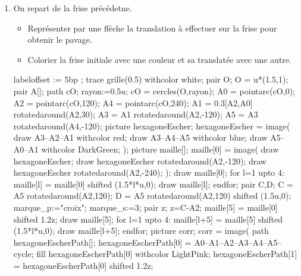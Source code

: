 \begin{corrige}
\begin{enumerate}
\begin{Geometrie}[CoinHD={(8u,3u)}]
        \end{Geometrie}
        \item On repart de la frise précédetne.
        \begin{itemize}
            \item Représenter par une flèche la translation à effectuer sur la frise pour obtenir le pavage.
            \item Colorier la frise initiale avec une couleur et sa translatée avec une autre.
        \end{itemize}
        \hspace*{-7mm}
        \begin{Geometrie}[CoinHD={(9u,4u)}]
            labeloffset := 5bp ;
            trace grille(0.5) withcolor white;
            pair O;
            O = u*(1.5,1);
            pair A[];
            path cO;
            rayon:=0.5u;
            cO = cercles(O,rayon);
            A0 = pointarc(cO,0);
            A2 = pointarc(cO,120);
            A4 = pointarc(cO,240);
            A1 = 0.3[A2,A0] rotatedaround(A2,30);
            A3 = A1 rotatedaround(A2,-120);
            A5 = A3 rotatedaround(A4,-120);        
            picture hexagoneEscher;
            hexagoneEscher = image(
                draw A3--A2--A1 withcolor red;        
                    draw A3--A4--A5 withcolor blue;        
                    draw A5--A0--A1 withcolor DarkGreen;
            );
            picture maille[];
            maille[0] = image(
                draw hexagoneEscher;
                draw hexagoneEscher rotatedaround(A2,-120);
                draw hexagoneEscher rotatedaround(A2,-240);
            );        
            draw maille[0];
            for l=1 upto 4:
                maille[l] = maille[0] shifted (1.5*l*u,0);
                draw maille[l];
            endfor;
            pair C,D;
            C = A5 rotatedaround(A2,120);
            D = A5 rotatedaround(A2,120) shifted (1.5u,0);
            marque_p:="croix";
            marque_s:=3;
            pair z;
            z=C-A2;
            maille[5] = maille[0] shifted 1.2z;
            draw maille[5];
            for l=1 upto 4:
                maille[l+5] = maille[5] shifted (1.5*l*u,0);
                    draw maille[l+5];
            endfor;            
            picture corr;
            corr = image(
            path hexagoneEscherPath[];            
            hexagoneEscherPath[0] = A0--A1--A2--A3--A4--A5--cycle;
            fill hexagoneEscherPath[0] withcolor LightPink;
            hexagoneEscherPath[1] = hexagoneEscherPath[0] shifted 1.2z;

\end{Geometrie}
\end{enumerate}
\end{corrige}
